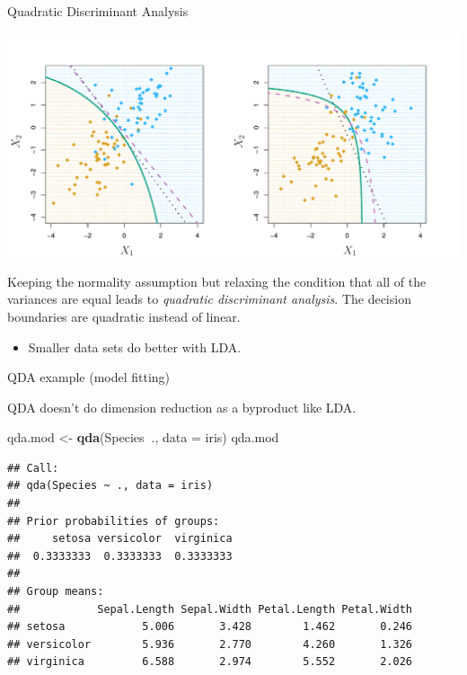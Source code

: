 \documentclass[
  ignorenonframetext,
]{beamer}
\newenvironment{Shaded}{\begin{snugshade}}{\end{snugshade}}
\newcommand{\DataTypeTok}[1]{\textcolor[rgb]{0.13,0.29,0.53}{#1}}
\newcommand{\KeywordTok}[1]{\textcolor[rgb]{0.13,0.29,0.53}{\textbf{#1}}}
\newcommand{\NormalTok}[1]{#1}
\newcommand{\OperatorTok}[1]{\textcolor[rgb]{0.81,0.36,0.00}{\textbf{#1}}}
\newcommand{\StringTok}[1]{\textcolor[rgb]{0.31,0.60,0.02}{#1}}
\providecommand{\tightlist}{%
  \setlength{\itemsep}{0pt}\setlength{\parskip}{0pt}}
\begin{document}
\begin{frame}{Quadratic Discriminant Analysis}
\protect\hypertarget{quadratic-discriminant-analysis}{}

\includegraphics{4.9.pdf}

Keeping the normality assumption but relaxing the condition that all of
the variances are equal leads to \emph{quadratic discriminant analysis}.
The decision boundaries are quadratic instead of linear.

\begin{itemize}
\tightlist
\item
  Smaller data sets do better with LDA.
\end{itemize}

\end{frame}

\begin{frame}[fragile]{QDA example (model fitting)}
\protect\hypertarget{qda-example-model-fitting}{}

QDA doesn't do dimension reduction as a byproduct like LDA.

\scriptsize

\begin{Shaded}
\begin{Highlighting}[]
\NormalTok{qda.mod <-}\StringTok{ }\KeywordTok{qda}\NormalTok{(Species}\OperatorTok{~}\NormalTok{., }\DataTypeTok{data =}\NormalTok{ iris)}
\NormalTok{qda.mod}
\end{Highlighting}
\end{Shaded}

\begin{verbatim}
## Call:
## qda(Species ~ ., data = iris)
## 
## Prior probabilities of groups:
##     setosa versicolor  virginica 
##  0.3333333  0.3333333  0.3333333 
## 
## Group means:
##            Sepal.Length Sepal.Width Petal.Length Petal.Width
## setosa            5.006       3.428        1.462       0.246
## versicolor        5.936       2.770        4.260       1.326
## virginica         6.588       2.974        5.552       2.026
\end{verbatim}

\end{frame}
\end{document}
